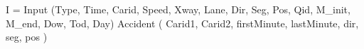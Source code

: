 \begin{comment}
\documentclass{article}

\usepackage{fullpage}

\usepackage{latexsym}
\usepackage{amsmath}
\usepackage{txfonts}
\usepackage{verbatim}

\newtheorem{theorem}{Theorem}[section]
\newtheorem{metatheorem}{Metatheorem}[section]
\newtheorem{example}[theorem]{Example}
\newtheorem{definition}[theorem]{Definition}
\newtheorem{proposition}[theorem]{Proposition}
\newtheorem{property}[theorem]{Property}
\newtheorem{corollary}[theorem]{Corollary}
\newtheorem{lemma}[theorem]{Lemma}
\newtheorem{remark}[theorem]{Remark}
\newtheorem{conjecture}[theorem]{Conjecture}
\newtheorem{proviso}[theorem]{Proviso}
\newtheorem{todo}[theorem]{ToDo}

\newcommand{\tuple}[1]{{\langle#1\rangle}}



\def\algsum{\mathrm{sum}}
\def\algagg{\mathrm{agg}}
\def\algtop{\mathrm{top}}
\def\algtopk{\mathrm{topk}}

\def\algnew{\mathrm{new}}
\def\algmin{\mathrm{min}}
\def\algmax{\mathrm{max}}
\def\algincr{\mathrm{incr}}
\def\algincrdiff{\mathrm{incrdiff}}
\def\alginsert{\mathrm{insert}}
\def\algupdate{\mathrm{update}}
\def\algdelete{\mathrm{delete}}
\def\algfor{\mathrm{foreach}}
\def\algavg{\mathrm{avg}}
\def\algsumr{\mbox{sumr}}
\def\algsumf{\mbox{sumf}}
\def\algaggf{\mbox{aggf}}
\def\algcount{\mbox{count}}
\def\distinct{\mbox{distinct}}
\def\routerjoin{\bowtie\!=}
\end{comment}
I = Input (Type, Time, Carid, Speed, Xway, Lane, Dir, Seg, Pos, Qid, M\_init, M\_end, Dow, Tod, Day)
Accident ( Carid1, Carid2, firstMinute, lastMinute, dir, seg, pos )

